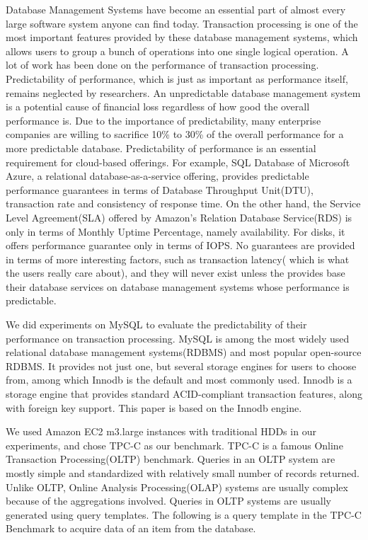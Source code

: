 Database Management Systems have become an essential part of almost every
large software system anyone can find today. Transaction processing is one of
the most important features provided by these database management systems,
which allows users to group a bunch of operations into one single logical
operation. A lot of work has been done on the performance of transaction
processing. Predictability of performance, which is just as important as
performance itself, remains neglected by researchers. An unpredictable database
management system is a potential cause of financial loss regardless of how good
the overall performance is. Due to the importance of predictability, many
enterprise companies are willing to sacrifice 10\% to 30\% of the overall
performance for a more predictable database. Predictability of performance is
an essential requirement for cloud-based offerings. For example, SQL Database
of Microsoft Azure, a relational database-as-a-service offering, provides
predictable performance guarantees in terms of Database Throughput Unit(DTU),
transaction rate and consistency of response time. On the other hand, the
Service Level Agreement(SLA) offered by Amazon's Relation Database Service(RDS)
is only in terms of Monthly Uptime Percentage, namely availability. For disks,
it offers performance guarantee only in terms of IOPS. No guarantees are
provided in terms of more interesting factors, such as transaction latency(
which is what the users really care about), and they will never exist unless
the provides base their database services on database management systems whose
performance is predictable.

We did experiments on MySQL to evaluate the predictability of their performance 
on transaction processing. MySQL is among the most widely used relational
database management systems(RDBMS) and most popular open-source RDBMS. It
provides not just one, but several storage engines for users to choose from,
among which Innodb is the default and most commonly used. Innodb is a storage
engine that provides standard ACID-compliant transaction features, along with
foreign key support. This paper is based on the Innodb engine.

We used Amazon EC2 m3.large instances with traditional HDDs in our experiments, 
and chose TPC-C as our benchmark. TPC-C is a famous Online Transaction
Processing(OLTP) benchmark. Queries in an OLTP system are mostly simple and
standardized with relatively small number of records returned. Unlike OLTP,
Online Analysis Processing(OLAP) systems are usually complex because of the
aggregations involved. Queries in OLTP systems are usually generated using
query templates. The following is a query template in the TPC-C Benchmark to
acquire data of an item from the database.


